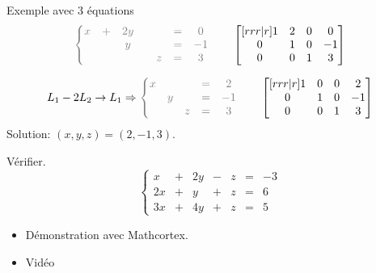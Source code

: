\documentclass[french]{beamer}
\begin{document}
\begin{frame}{Exemple avec 3 équations}
\[\color{gray}
\left\{
	\begin{matrix}
		x &+& 2y && &=& 0\\
		 && y && &=& -1\\
		 &&  && z &=& 3
	\end{matrix}\right.
	\qquad\color{black}
	\begin{bmatrix}[rrr|r]
        1 & 2 & 0 & 0 \\
        0 & 1 & 0 & -1 \\
        0 & 0 & 1 & 3
\end{bmatrix}
\color{black}
\]

\[
	L_1 -2 L_2 \rightarrow L_1
 \Rightarrow
\color{gray}
\left\{
	\begin{matrix}
	x & && =& 2\\
	 & y &&=& -1\\
	  && z &=& 3
	\end{matrix}\right.
	\qquad\color{black}
	\begin{bmatrix}[rrr|r]
        1 & 0 & 0 & 2 \\
        0 & 1 & 0 & -1 \\
        0 & 0 & 1 & 3
\end{bmatrix}
\]
Solution: $(x, y, z) = (2, -1, 3)$. 

\color{red}
\mbox{Vérifier.}
\[
	\left\{
	\begin{matrix}
	x &+& 2y &-& z &=& -3\\
	2x &+& y &+& z &=& 6\\
	3x &+& 4y &+& z &=& 5
	\end{matrix}\right.
	\]

\end{frame}

\begin{frame}{}
\begin{itemize}
\item Démonstration avec Mathcortex.
\item Vidéo
\end{itemize}

\end{frame}
\end{document}
